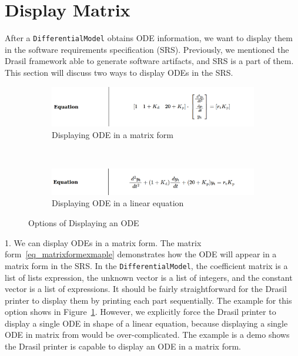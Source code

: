 \section{Display Matrix}
After a \verb|DifferentialModel| obtains ODE information, we want to display them in the software requirements specification (SRS). Previously, we mentioned the Drasil framework able to generate software artifacts, and SRS is a part of them. This section will discuss two ways to display ODEs in the SRS.

\begin{figure}[ht]
	\centering
	\begin{subfigure}[t]{\textwidth}
		\centering
		
\includegraphics[width=1\textwidth]{figures/ODEInMatrix.png}
		\caption{Displaying ODE in a matrix form}
		\label{fig_multienv_odematrix}
	\end{subfigure}
	~
	\begin{subfigure}[t]{\textwidth}
		\centering
	
\includegraphics[width=1\textwidth]{figures/ODEInLinearEq.png}
		\caption{Displaying ODE in a linear equation}
		\label{fig_multienv_odelinear}
	\end{subfigure}
	
	\caption{Options of Displaying an ODE}
	\label{fig_multienv}
\end{figure}

1. We can display ODEs in a matrix form. The matrix form~\ref{eq_matrixformexmaple} demonstrates how the ODE will appear in a matrix form in the SRS. In the \verb|DifferentialModel|, the coefficient matrix is a list of lists expression, the unknown vector is a list of integers, and the constant vector is a list of expressions. It should be fairly straightforward for the Drasil printer to display them by printing each part sequentially. The example for this option shows in Figure~\ref{fig_multienv_odematrix}. However, we explicitly force the Drasil printer to display a single ODE in shape of a linear equation, because displaying a single ODE in matrix from would be over-complicated. The example is a demo shows the Drasil printer is capable to display an ODE in a matrix form.

